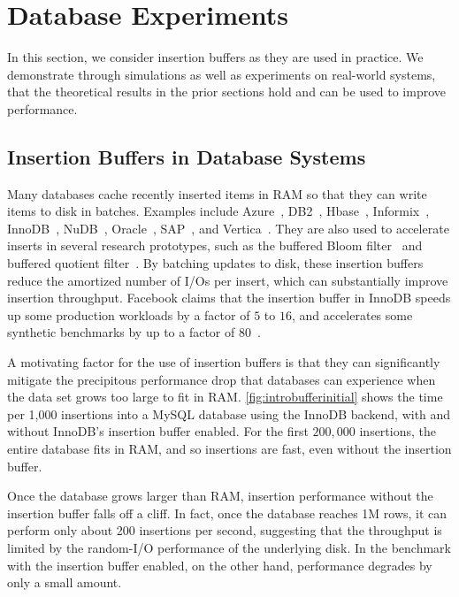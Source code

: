 \section{Database Experiments}\label{sec:br-experiments}
In this section, we consider insertion buffers as they are used in practice. We
demonstrate through simulations as well as experiments on real-world systems,
that the theoretical results in the prior sections hold and can be used to
improve performance.

\subsection{Insertion Buffers in Database Systems}
Many databases cache recently inserted items in RAM so that they can write
items to disk in batches.  Examples include
Azure~\cite{Azure16}, 
DB2~\cite{IBM17},  
Hbase~\cite{Xiang12}, 
Informix~\cite{Informix}, 
InnoDB~\cite{Callaghan11},  
NuDB~\cite{NuDB16},  
Oracle~\cite{Oracle17},  
SAP~\cite{SAP17},  and 
Vertica~\cite{Vertica17}.
They are also used to accelerate inserts in several research prototypes, such
as the buffered Bloom
filter~\cite{CanimLaMi10} and buffered quotient
filter~\cite{BenderFaJo12}.  
By batching updates to disk, these insertion buffers reduce the amortized
number of I/Os per insert, which can substantially improve insertion
throughput.  Facebook claims that the insertion buffer in InnoDB speeds up some
production workloads by a factor of $5$ to $16$, and accelerates some synthetic
benchmarks by up to a factor of $80$~\cite{Callaghan11}.

A motivating factor for the use of insertion buffers is that they can
significantly mitigate the precipitous performance drop that databases can
experience when the data set grows too large to fit in RAM.
\cref{fig:introbufferinitial} shows the time per 1,000 insertions into a MySQL
database using the InnoDB backend, with and without InnoDB's insertion buffer
enabled.  For the first $200,000$ insertions, the entire database fits in RAM,
and so insertions are fast, even without the insertion buffer.

Once the database grows larger than RAM, insertion performance without the
insertion buffer falls off a cliff.  In fact, once the database reaches 1M
rows, it can perform only about 200 insertions per second, suggesting that the
throughput is limited by the random-I/O performance of the underlying disk.  In
the benchmark with the insertion buffer enabled, on the other hand, performance
degrades by only a small amount.

